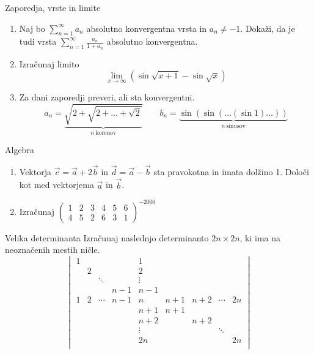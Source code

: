 \begin{frame}{Zaporedja, vrste in limite}
	\begin{enumerate}
		\item 
		Naj bo $\sum_{n=1}^{\infty}a_n$ absolutno konvergentna vrsta in $a_n \ne -1$.
		Dokaži, da je tudi vrsta $\sum_{n=1}^\infty \frac{a_n}{1+a_n}$
		absolutno konvergentna.

		\item
		Izračunaj limito
		$$\lim_{x\rightarrow\infty}(\sin\sqrt{x+1}-\sin\sqrt{x})$$

		\item
		Za dani zaporedji preveri, ali sta konvergentni.
		$$ a_n = \underbrace{\sqrt{2+\sqrt{2+\dots+\sqrt{2}}}}_{n~\text{korenov}} \qquad
		 b_n = \underbrace{\sin(\sin(\dots(\sin 1)\dots))}_{n~\text{sinusov}}$$
		
	\end{enumerate}
\end{frame}

\begin{frame}{Algebra}
	\begin{enumerate}
		\item
		Vektorja $\vec{c}=\vec{a}+2\vec{b}$ in $\vec{d}=\vec{a}-\vec{b}$
		sta pravokotna in imata dolžino 1. Določi kot med vektorjema $\vec{a}$ in $\vec{b}$.
		\item 
		Izračunaj
		$\textstyle{\begin{pmatrix}
			1 & 2 & 3 & 4 & 5 & 6\\
			4 & 5 & 2 & 6 & 3 & 1
		\end{pmatrix}^{-2000}}$
	\end{enumerate}
\end{frame}

\begin{frame}{Velika determinanta}
	Izračunaj naslednjo determinanto $2n \times 2n$, ki ima na neoznačenih mestih ničle.
	$$\begin{vmatrix}
		1 &   &       &     & 1    &      &      &         &      \\
		  & 2 &       &     & 2    &      &      &         &      \\
		  &   &\ddots &     &\vdots&      &      &         &      \\
		  &   &       & n-1 & n-1  &      &      &         &      \\
		1 & 2 &\cdots & n-1 & n    & n+1  & n+2  & \cdots  & 2n   \\
		  &   &       &     &n+1   &n+1   &      &         &      \\
		  &   &		  &	    &n+2   &      &n+2   &         &      \\
          &   &       &     &\vdots&      &      & \ddots  &      \\
		  &   &       &     & 2n   &      &      &         & 2n   \\
		\end{vmatrix}$$
\end{frame}

